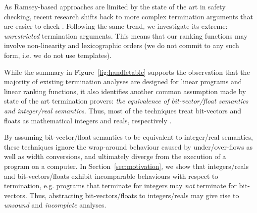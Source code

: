 \documentclass[preprint]{sigplanconf}
\theoremstyle{definition}
\begin{document}
As Ramsey-based approaches are limited by the state of the art in safety checking, 
recent research shifts back to more complex termination arguments that are easier to check \cite{DBLP:conf/tacas/CookSZ13,DBLP:conf/cav/KroeningSTW10}.
%
%
Following the same trend, %
we investigate its extreme: \emph{unrestricted} termination arguments. 
This means that our ranking functions may involve non-linearity and lexicographic orders (we do not commit to any such form, i.e. we do not use templates).


While the summary  in Figure~\ref{fig:handletable} supports the observation that the majority of existing termination analyses are designed for
linear programs and linear ranking functions, it also identifies another common assumption made by state of the art termination provers: 
\emph{the equivalence of bit-vector/float semantics and integer/real semantics}. Thus, most of the techniques treat
bit-vectors and floats as mathematical integers and reals, respectively  \cite{DBLP:conf/pldi/CookPR06,DBLP:conf/popl/Ben-AmramG13,DBLP:conf/vmcai/P04,DBLP:conf/atva/HeizmannHLP13,DBLP:conf/vmcai/BradleyMS05,DBLP:conf/cav/KroeningSTW10}. 


By assuming bit-vector/float semantics to be equivalent to integer/real semantics, 
these techniques ignore the wrap-around behaviour caused by under/over-flows as well as width conversions, 
and ultimately diverge from the execution of a program on a computer.  
In Section~\ref{sec:motivation}, we show that integers/reals and bit-vectors/floats exhibit
incomparable behaviours with respect to termination, e.g.
programs that terminate for integers may \emph{not} terminate for bit-vectors.
Thus, abstracting bit-vectors/floats to integers/reals may give rise to 
{\em unsound} and {\em incomplete} analyses.



\end{document}
